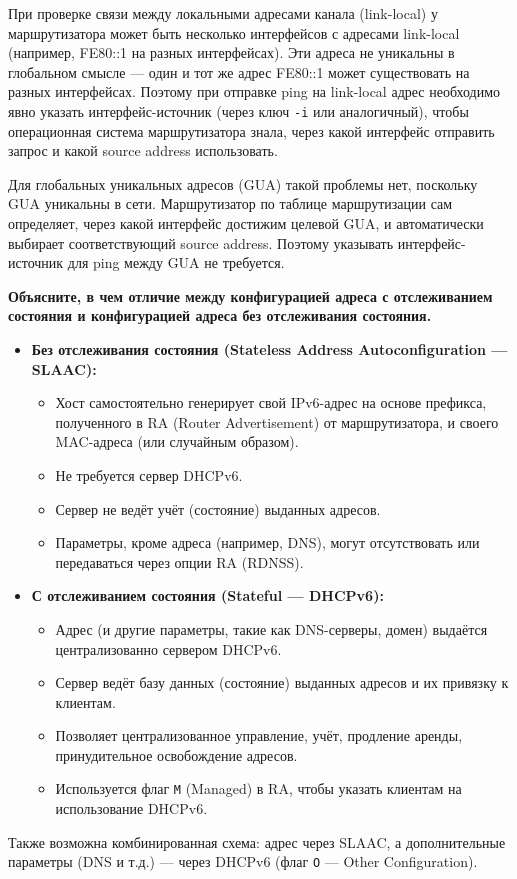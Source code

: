 При проверке связи между локальными адресами канала (link-local) у маршрутизатора может быть несколько интерфейсов с адресами link-local (например, FE80::1 на разных интерфейсах). Эти адреса не уникальны в глобальном смысле — один и тот же адрес FE80::1 может существовать на разных интерфейсах. Поэтому при отправке ping на link-local адрес необходимо явно указать интерфейс-источник (через ключ \texttt{-i} или аналогичный), чтобы операционная система маршрутизатора знала, через какой интерфейс отправить запрос и какой source address использовать.

Для глобальных уникальных адресов (GUA) такой проблемы нет, поскольку GUA уникальны в сети. Маршрутизатор по таблице маршрутизации сам определяет, через какой интерфейс достижим целевой GUA, и автоматически выбирает соответствующий source address. Поэтому указывать интерфейс-источник для ping между GUA не требуется.

\textbf{Объясните, в чем отличие между конфигурацией адреса с отслеживанием состояния и конфигурацией адреса без отслеживания состояния.}

\begin{itemize}
    \item \textbf{Без отслеживания состояния (Stateless Address Autoconfiguration — SLAAC):}
    \begin{itemize}
        \item Хост самостоятельно генерирует свой IPv6-адрес на основе префикса, полученного в RA (Router Advertisement) от маршрутизатора, и своего MAC-адреса (или случайным образом).
        \item Не требуется сервер DHCPv6.
        \item Сервер не ведёт учёт (состояние) выданных адресов.
        \item Параметры, кроме адреса (например, DNS), могут отсутствовать или передаваться через опции RA (RDNSS).
    \end{itemize}
    
    \item \textbf{С отслеживанием состояния (Stateful — DHCPv6):}
    \begin{itemize}
        \item Адрес (и другие параметры, такие как DNS-серверы, домен) выдаётся централизованно сервером DHCPv6.
        \item Сервер ведёт базу данных (состояние) выданных адресов и их привязку к клиентам.
        \item Позволяет централизованное управление, учёт, продление аренды, принудительное освобождение адресов.
        \item Используется флаг \texttt{M} (Managed) в RA, чтобы указать клиентам на использование DHCPv6.
    \end{itemize}
\end{itemize}

Также возможна комбинированная схема: адрес через SLAAC, а дополнительные параметры (DNS и т.д.) — через DHCPv6 (флаг \texttt{O} — Other Configuration).


